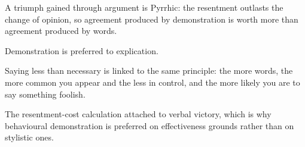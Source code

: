 

\begin{distilled}
  \item A triumph gained through argument is Pyrrhic: the resentment outlasts the change of opinion, so agreement produced by demonstration is worth more than agreement produced by words.
  \item Demonstration is preferred to explication.
  \item Saying less than necessary is linked to the same principle: the more words, the more common you appear and the less in control, and the more likely you are to say something foolish.
\end{distilled}

\begin{unique}
  \item The resentment-cost calculation attached to verbal victory, which is why behavioural demonstration is preferred on effectiveness grounds rather than on stylistic ones.
\end{unique}
